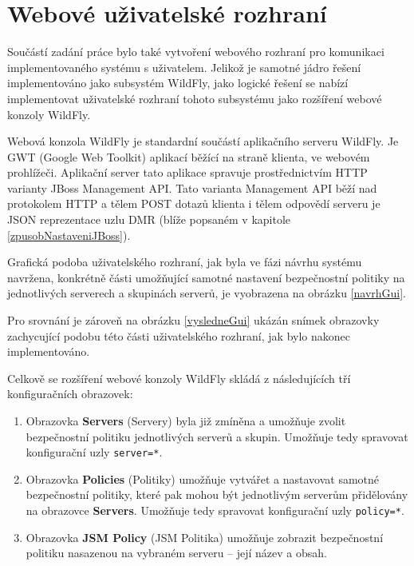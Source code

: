 \section{Webové uživatelské rozhraní} \label{navrhGUI}

Součástí zadání práce bylo také vytvoření webového rozhraní pro komunikaci implementovaného systému s uživatelem.
Jelikož je samotné jádro řešení implementováno jako subsystém WildFly, jako logické řešení se nabízí implementovat uživatelské rozhraní tohoto subsystému jako rozšíření webové konzoly WildFly.

Webová konzola WildFly je standardní součástí aplikačního serveru WildFly. Je GWT (Google Web Toolkit) aplikací běžící na straně klienta, ve webovém prohlížeči.
Aplikační server tato aplikace spravuje prostřednictvím HTTP varianty JBoss Management API.
Tato varianta Management API běží nad protokolem HTTP a tělem POST dotazů klienta i tělem odpovědí serveru je JSON reprezentace uzlu DMR (blíže popsaném v kapitole \ref{zpusobNastaveniJBoss}).
\cite{WildFlyManagementAPIreference}

Grafická podoba uživatelského rozhraní, jak byla ve fázi návrhu systému navržena, konkrétně části umožňující samotné nastavení bezpečnostní politiky na jednotlivých serverech a skupinách serverů, je vyobrazena na obrázku \ref{navrhGui}.

Pro srovnání je zároveň na obrázku \ref{vysledneGui} ukázán snímek obrazovky zachycující podobu této části uživatelského rozhraní, jak bylo nakonec implementováno.

Celkově se rozšíření webové konzoly WildFly skládá z následujících tří konfiguračních obrazovek:

\begin{enumerate}
  
  \item Obrazovka {\bf Servers} (Servery) byla již zmíněna a umožňuje zvolit bezpečnostní politiku jednotlivých serverů a skupin. Umožňuje tedy spravovat konfigurační uzly {\tt server=*}.
  
  \item Obrazovka {\bf Policies} (Politiky) umožňuje vytvářet a nastavovat samotné bezpečnostní politiky, které pak mohou být jednotlivým serverům přidělovány na obrazovce {\bf Servers}. Umožňuje tedy spravovat konfigurační uzly {\tt policy=*}.
  
  \item Obrazovka {\bf JSM Policy} (JSM Politika) umožňuje zobrazit bezpečnostní politiku nasazenou na vybraném serveru -- její název a obsah.
  
\end{enumerate}

